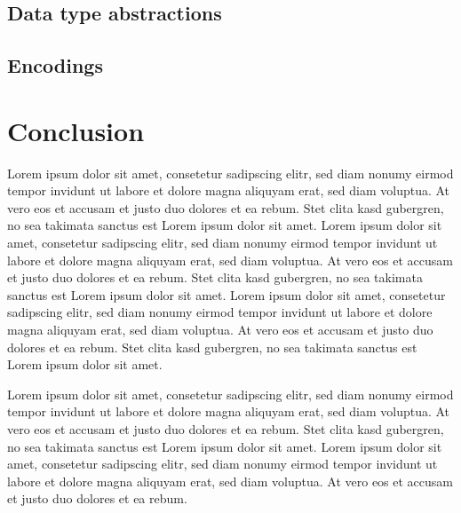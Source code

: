 \documentclass[journal]{vgtc}                %
\begin{document}

\subsection{Data type abstractions}


\subsection{Encodings}



\section{Conclusion}

Lorem ipsum dolor sit amet, consetetur sadipscing elitr, sed diam
nonumy eirmod tempor invidunt ut labore et dolore magna aliquyam erat,
sed diam voluptua. At vero eos et accusam et justo duo dolores et ea
rebum. Stet clita kasd gubergren, no sea takimata sanctus est Lorem
ipsum dolor sit amet. Lorem ipsum dolor sit amet, consetetur
sadipscing elitr, sed diam nonumy eirmod tempor invidunt ut labore et
dolore magna aliquyam erat, sed diam voluptua. At vero eos et accusam
et justo duo dolores et ea rebum. Stet clita kasd gubergren, no sea
takimata sanctus est Lorem ipsum dolor sit amet. Lorem ipsum dolor sit
amet, consetetur sadipscing elitr, sed diam nonumy eirmod tempor
invidunt ut labore et dolore magna aliquyam erat, sed diam
voluptua. At vero eos et accusam et justo duo dolores et ea
rebum. Stet clita kasd gubergren, no sea takimata sanctus est Lorem
ipsum dolor sit amet.

Lorem ipsum dolor sit amet, consetetur sadipscing elitr, sed diam
nonumy eirmod tempor invidunt ut labore et dolore magna aliquyam erat,
sed diam voluptua. At vero eos et accusam et justo duo dolores et ea
rebum. Stet clita kasd gubergren, no sea takimata sanctus est Lorem
ipsum dolor sit amet. Lorem ipsum dolor sit amet, consetetur
sadipscing elitr, sed diam nonumy eirmod tempor invidunt ut labore et
dolore magna aliquyam erat, sed diam voluptua. At vero eos et accusam
et justo duo dolores et ea rebum. 




\end{document}
